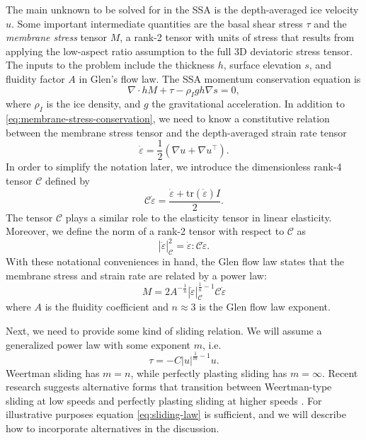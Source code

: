 \documentclass{article}
\theoremstyle{definition}
\theoremstyle{plain}
\begin{document}
The main unknown to be solved for in the SSA is the depth-averaged ice velocity $u$.
Some important intermediate quantities are the basal shear stress $\tau$ and the \emph{membrane stress} tensor $M$, a rank-2 tensor with units of stress that results from applying the low-aspect ratio assumption to the full 3D deviatoric stress tensor.
The inputs to the problem include the thickness $h$, surface elevation $s$, and fluidity factor $A$ in Glen's flow law.
The SSA momentum conservation equation is
\begin{equation}
    \nabla\cdot hM + \tau - \rho_I gh\nabla s = 0,
    \label{eq:membrane-stress-conservation}
\end{equation}
where $\rho_I$ is the ice density, and $g$ the gravitational acceleration.
In addition to \eqref{eq:membrane-stress-conservation}, we need to know a constitutive relation between the membrane stress tensor and the depth-averaged strain rate tensor
\begin{equation}
    \dot\varepsilon = \frac{1}{2}\left(\nabla u + \nabla u^\top\right).
    \label{eq:strain-rate}
\end{equation}
In order to simplify the notation later, we introduce the dimensionless rank-4 tensor $\mathscr{C}$ defined by
\begin{equation}
    \mathscr{C}\dot\varepsilon = \frac{\dot\varepsilon + \text{tr}(\dot\varepsilon)I}{2}.
    \label{eq:elasticity-tensor}
\end{equation}
The tensor $\mathscr{C}$ plays a similar role to the elasticity tensor in linear elasticity.
Moreover, we define the norm of a rank-2 tensor with respect to $\mathscr{C}$ as
\begin{equation}
    |\dot\varepsilon|_{\mathscr{C}}^2 = \dot\varepsilon : \mathscr{C}\dot\varepsilon.
\end{equation}
With these notational conveniences in hand, the Glen flow law states that the membrane stress and strain rate are related by a power law:
\begin{equation}
    M = 2A^{-\frac{1}{n}}|\dot\varepsilon|_{\mathscr C}^{\frac{1}{n} - 1}\mathscr{C}\dot\varepsilon
    \label{eq:constitutive-relation}
\end{equation}
where $A$ is the fluidity coefficient and $n \approx 3$ is the Glen flow law exponent.

Next, we need to provide some kind of sliding relation.
We will assume a generalized power law with some exponent $m$, i.e.
\begin{equation}
    \tau = -C|u|^{\frac{1}{m} - 1}u.
    \label{eq:sliding-law}
\end{equation}
Weertman sliding has $m = n$, while perfectly plasting sliding has $m = \infty$.
Recent research suggests alternative forms that transition between Weertman-type sliding at low speeds and perfectly plasting sliding at higher speeds \citep{minchew2020toward}.
For illustrative purposes equation \eqref{eq:sliding-law} is sufficient, and we will describe how to incorporate alternatives in the discussion.
\end{document}
